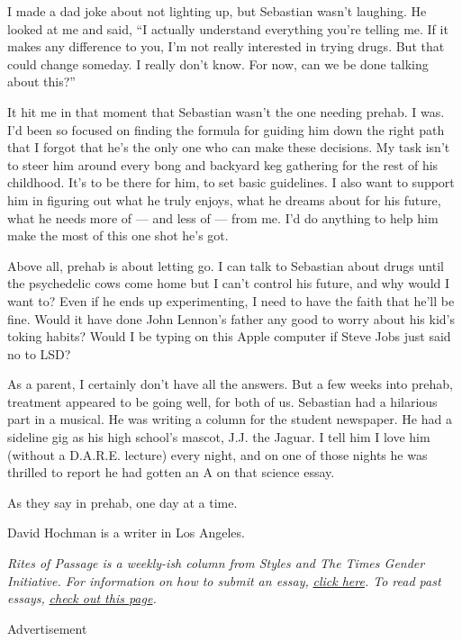 I made a dad joke about not lighting up, but Sebastian wasn't laughing.
He looked at me and said, ``I actually understand everything you're
telling me. If it makes any difference to you, I'm not really interested
in trying drugs. But that could change someday. I really don't know. For
now, can we be done talking about this?''

It hit me in that moment that Sebastian wasn't the one needing prehab. I
was. I'd been so focused on finding the formula for guiding him down the
right path that I forgot that he's the only one who can make these
decisions. My task isn't to steer him around every bong and backyard keg
gathering for the rest of his childhood. It's to be there for him, to
set basic guidelines. I also want to support him in figuring out what he
truly enjoys, what he dreams about for his future, what he needs more of
--- and less of --- from me. I'd do anything to help him make the most
of this one shot he's got.

Above all, prehab is about letting go. I can talk to Sebastian about
drugs until the psychedelic cows come home but I can't control his
future, and why would I want to? Even if he ends up experimenting, I
need to have the faith that he'll be fine. Would it have done John
Lennon's father any good to worry about his kid's toking habits? Would I
be typing on this Apple computer if Steve Jobs just said no to LSD?

As a parent, I certainly don't have all the answers. But a few weeks
into prehab, treatment appeared to be going well, for both of us.
Sebastian had a hilarious part in a musical. He was writing a column for
the student newspaper. He had a sideline gig as his high school's
mascot, J.J. the Jaguar. I tell him I love him (without a D.A.R.E.
lecture) every night, and on one of those nights he was thrilled to
report he had gotten an A on that science essay.

As they say in prehab, one day at a time.

David Hochman is a writer in Los Angeles.

\emph{Rites of Passage is a weekly-ish column from Styles and The Times
Gender Initiative. For information on how to submit an essay,}
\href{https://www.nytimes3xbfgragh.onion/2018/07/06/style/how-to-submit-a-rites-of-passage-essay.html?module=inline}{\emph{click
here}}\emph{. ​To read past essays,}
\href{https://www.nytimes3xbfgragh.onion/column/rites-of-passage}{\emph{check
out this page}}\emph{.}

Advertisement

